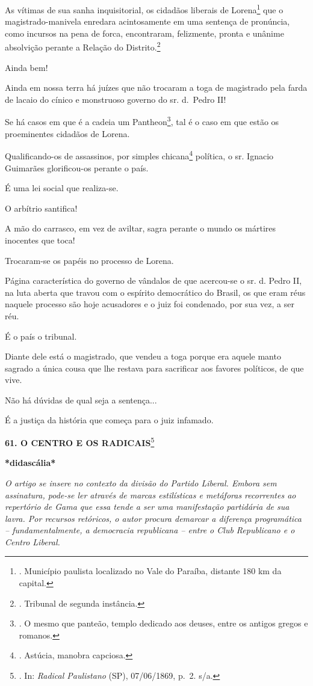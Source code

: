 As vítimas de sua sanha inquisitorial, os cidadãos liberais de
Lorena\footnote{. Município paulista localizado no Vale do Paraíba,
  distante 180 km da capital.} que o magistrado-manivela enredara
acintosamente em uma sentença de pronúncia, como incursos na pena de
forca, encontraram, felizmente, pronta e unânime absolvição perante a
Relação do Distrito.\footnote{. Tribunal de segunda instância.}

Ainda bem!

Ainda em nossa terra há juízes que não trocaram a toga de magistrado
pela farda de lacaio do cínico e monstruoso governo do sr. d.~Pedro II!

Se há casos em que é a cadeia um Pantheon\footnote{. O mesmo que
  panteão, templo dedicado aos deuses, entre os antigos gregos e
  romanos.}, tal é o caso em que estão os proeminentes cidadãos de
Lorena.

Qualificando-os de assassinos, por simples chicana\footnote{. Astúcia,
  manobra capciosa.} política, o sr. Ignacio Guimarães glorificou-os
perante o país.

É uma lei social que realiza-se.

O arbítrio santifica!

A mão do carrasco, em vez de aviltar, sagra perante o mundo os mártires
inocentes que toca!

Trocaram-se os papéis no processo de Lorena.

Página característica do governo de vândalos de que acercou-se o sr. d.
Pedro II, na luta aberta que travou com o espírito democrático do
Brasil, os que eram réus naquele processo são hoje acusadores e o juiz
foi condenado, por sua vez, a ser réu.

É o país o tribunal.

Diante dele está o magistrado, que vendeu a toga porque era aquele manto
sagrado a única cousa que lhe restava para sacrificar aos favores
políticos, de que vive.

Não há dúvidas de qual seja a sentença...

É a justiça da história que começa para o juiz infamado.

\textbf{61. O CENTRO E OS RADICAIS}\footnote{. In: \emph{Radical
  Paulistano} (SP), 07/06/1869, p.~2. s/a.}

\textbf{*didascália*}

\emph{O artigo se insere no contexto da divisão do Partido Liberal.
Embora sem assinatura, pode-se ler através de marcas estilísticas e
metáforas recorrentes ao repertório de Gama que essa tende a ser uma
manifestação partidária de sua lavra. Por recursos retóricos, o autor
procura demarcar a diferença programática -- fundamentalmente, a
democracia republicana -- entre o Club Republicano e o Centro Liberal.}

